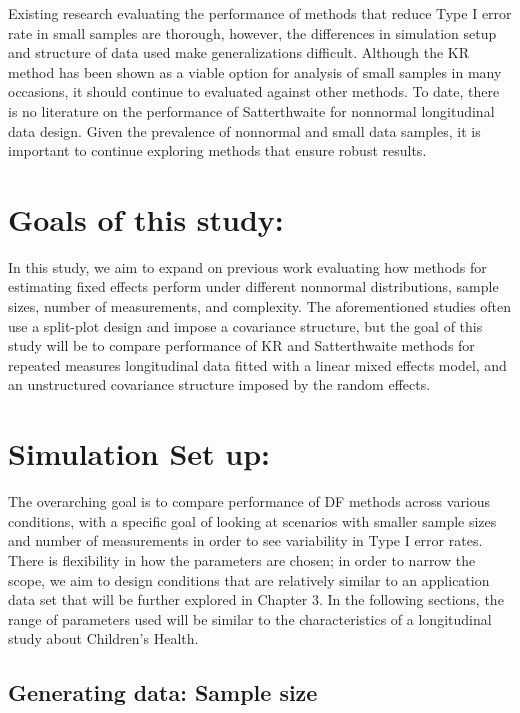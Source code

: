 \documentclass[12pt, twoside]{amherstthesis}
\begin{document}
Existing research evaluating the performance of methods that reduce Type I error rate in small samples are thorough, however, the differences in simulation setup and structure of data used make generalizations difficult. Although the KR method has been shown as a viable option for analysis of small samples in many occasions, it should continue to evaluated against other methods. To date, there is no literature on the performance of Satterthwaite for nonnormal longitudinal data design. Given the prevalence of nonnormal and small data samples, it is important to continue exploring methods that ensure robust results.

\hypertarget{goals-of-this-study}{%
\section{Goals of this study:}\label{goals-of-this-study}}

In this study, we aim to expand on previous work evaluating how methods for estimating fixed effects perform under different nonnormal distributions, sample sizes, number of measurements, and complexity. The aforementioned studies often use a split-plot design and impose a covariance structure, but the goal of this study will be to compare performance of KR and Satterthwaite methods for repeated measures longitudinal data fitted with a linear mixed effects model, and an unstructured covariance structure imposed by the random effects.

\hypertarget{simulation-set-up}{%
\section{Simulation Set up:}\label{simulation-set-up}}

The overarching goal is to compare performance of DF methods across various conditions, with a specific goal of looking at scenarios with smaller sample sizes and number of measurements in order to see variability in Type I error rates. There is flexibility in how the parameters are chosen; in order to narrow the scope, we aim to design conditions that are relatively similar to an application data set that will be further explored in Chapter 3. In the following sections, the range of parameters used will be similar to the characteristics of a longitudinal study about Children's Health.

\hypertarget{generating-data-sample-size}{%
\subsection{Generating data: Sample size}\label{generating-data-sample-size}}
\end{document}
